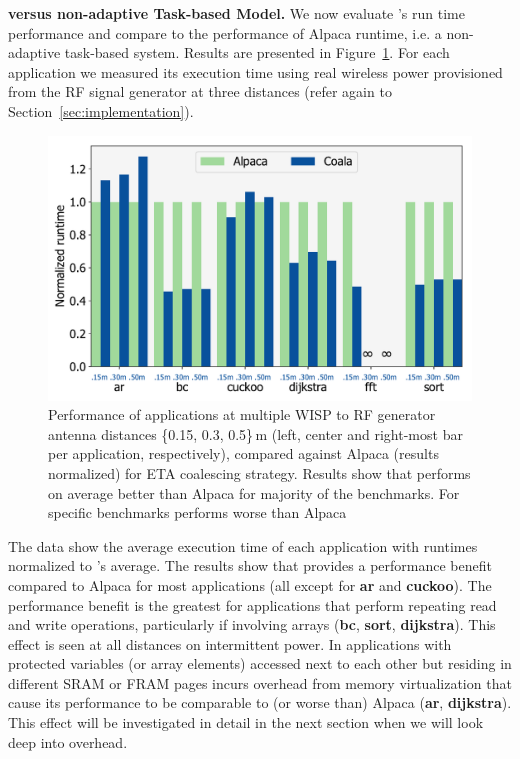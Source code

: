 \textbf{\sys versus non-adaptive Task-based Model.} We now evaluate \sys's run time performance and compare \sys to the performance of Alpaca runtime, i.e. a non-adaptive task-based system. Results are presented in Figure~\ref{fig:runtime}. For each application we measured its execution time using real wireless power provisioned from the RF signal generator at three distances (refer again to Section~\ref{sec:implementation}).

\begin{figure}
	\centering
	\includegraphics[width=\columnwidth]{figures/coala_alpaca_gcc}
	\caption{Performance of \sys applications at multiple WISP to RF generator antenna distances \{0.15, 0.3, 0.5\}\,m (left, center and right-most bar per application, respectively), compared against Alpaca (results normalized) for ETA coalescing strategy. Results show that \sys performs on average better than Alpaca for majority of the benchmarks. For specific benchmarks \sys performs worse than Alpaca }
	\label{fig:runtime}
\end{figure}

The data show the average execution time of each application with runtimes normalized to \sys's average.  The results show that \sys provides a performance benefit compared to Alpaca for most applications (all except for \textbf{ar} and \textbf{cuckoo}). The performance benefit is the greatest for applications that perform repeating read and write operations, particularly if involving arrays (\textbf{bc}, \textbf{sort}, \textbf{dijkstra}). This effect is seen at all distances on intermittent power. In applications with protected variables (or array elements) accessed next to each other but residing in different SRAM or FRAM pages \sys incurs overhead from memory virtualization that cause its performance to be comparable to (or worse than) Alpaca (\textbf{ar}, \textbf{dijkstra}). This effect will be investigated in detail in the next section when we will look deep into \sys overhead. 

